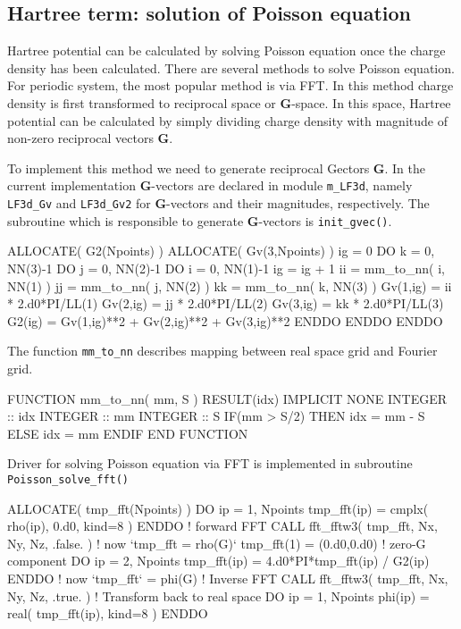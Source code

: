 \subsection{Hartree term: solution of Poisson equation}

Hartree potential can be calculated by solving Poisson equation
once the charge density has been calculated.
There are several methods to solve Poisson equation.
For periodic system, the most popular method is via FFT.
In this method charge density is first transformed to
reciprocal space or $\mathbf{G}$-space. In this space,
Hartree potential can be calculated by simply dividing
charge density with magnitude of non-zero reciprocal vectors
$\mathbf{G}$.

To implement this method we need to generate reciprocal Gectors
$\mathbf{G}$. In the current implementation $\mathbf{G}$-vectors
are declared in module {\tt m\_LF3d}, namely
{\tt LF3d\_Gv} and {\tt LF3d\_Gv2} for $\mathbf{G}$-vectors and
their magnitudes, respectively.
The subroutine which
is responsible to generate $\mathbf{G}$-vectors is
{\tt init\_gvec()}.

\begin{fortrancode}
ALLOCATE( G2(Npoints) )
ALLOCATE( Gv(3,Npoints) )
ig = 0
DO k = 0, NN(3)-1
DO j = 0, NN(2)-1
DO i = 0, NN(1)-1
  ig = ig + 1
  ii = mm_to_nn( i, NN(1) )
  jj = mm_to_nn( j, NN(2) )
  kk = mm_to_nn( k, NN(3) )
  Gv(1,ig) = ii * 2.d0*PI/LL(1)
  Gv(2,ig) = jj * 2.d0*PI/LL(2)
  Gv(3,ig) = kk * 2.d0*PI/LL(3)
  G2(ig) = Gv(1,ig)**2 + Gv(2,ig)**2 + Gv(3,ig)**2
ENDDO
ENDDO
ENDDO
\end{fortrancode}

The function {\tt mm\_to\_nn} describes mapping between real space grid
and Fourier grid.

\begin{fortrancode}
FUNCTION mm_to_nn( mm, S ) RESULT(idx)
  IMPLICIT NONE
  INTEGER :: idx
  INTEGER :: mm
  INTEGER :: S
  IF(mm > S/2) THEN 
    idx = mm - S
  ELSE
    idx = mm
  ENDIF
END FUNCTION 
\end{fortrancode}

Driver for solving Poisson equation via FFT is implemented
in subroutine {\tt Poisson\_solve\_fft()}
\begin{fortrancode}
ALLOCATE( tmp_fft(Npoints) )
DO ip = 1, Npoints
  tmp_fft(ip) = cmplx( rho(ip), 0.d0, kind=8 )
ENDDO
! forward FFT
CALL fft_fftw3( tmp_fft, Nx, Ny, Nz, .false. )  ! now `tmp_fft = rho(G)`
tmp_fft(1) = (0.d0,0.d0)  ! zero-G component
DO ip = 2, Npoints
  tmp_fft(ip) = 4.d0*PI*tmp_fft(ip) / G2(ip)
ENDDO  ! now `tmp_fft` = phi(G)
! Inverse FFT
CALL fft_fftw3( tmp_fft, Nx, Ny, Nz, .true. )
! Transform back to real space
DO ip = 1, Npoints
  phi(ip) = real( tmp_fft(ip), kind=8 )
ENDDO
\end{fortrancode}

